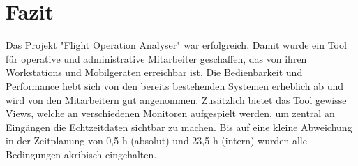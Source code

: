 \section{Fazit}
    Das Projekt "Flight Operation Analyser" war erfolgreich. Damit wurde ein Tool für operative und administrative Mitarbeiter geschaffen, das von ihren Workstations und Mobilgeräten erreichbar ist. Die Bedienbarkeit und Performance hebt sich von den bereits bestehenden Systemen erheblich ab und wird von den Mitarbeitern gut angenommen. Zusätzlich bietet das Tool gewisse Views, welche an verschiedenen Monitoren aufgespielt werden, um zentral an Eingängen die Echtzeitdaten sichtbar zu machen. Bis auf eine kleine Abweichung in der Zeitplanung von 0,5 h (absolut) und 23,5 h (intern) wurden alle Bedingungen akribisch eingehalten. 